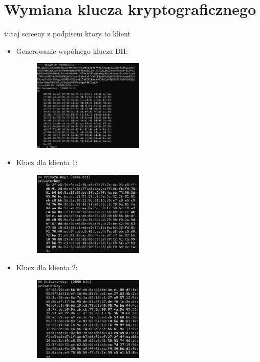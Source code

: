 \documentclass{article}
\begin{document}
\section{Wymiana klucza kryptograficznego}
tutaj screeny z podpisem ktory to klient

\begin{itemize}
  \item Generowanie wspólnego klucza DH:
        \begin{figure}[H]
          \centering
          \includegraphics[width=0.5\textwidth]{klucz_wspolny.png}
        \end{figure}
  \item  Klucz dla klienta 1:
        \begin{figure}[H]
          \centering
          \includegraphics[width=0.5\textwidth]{client1_private_key.png}
        \end{figure}
  \item Klucz dla klienta 2:
        \begin{figure}[H]
          \centering
          \includegraphics[width=0.5\textwidth]{client2_private_key.png}

\end{figure}
\end{itemize}
\end{document}
